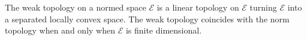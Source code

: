 The weak topology on a normed space $\mathcal{E}$ is a linear topology on $\mathcal{E}$ turning $\mathcal{E}$ into a separated locally convex space. The weak topology coincides with the norm topology when and only when $\mathcal{E}$ is finite dimensional.
